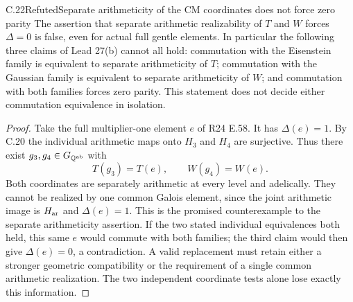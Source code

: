 \begin{statement}{C.22}{Refuted}{Separate arithmeticity of the CM coordinates does not force zero parity}
The assertion that separate arithmetic realizability of $T$
and $W$ forces $\Delta=0$ is false, even for actual full
gentle elements. In particular the following three claims
of Lead 27(b) cannot all hold: commutation with the
Eisenstein family is equivalent to separate arithmeticity
of $T$; commutation with the Gaussian family is equivalent
to separate arithmeticity of $W$; and commutation with
both families forces zero parity.
This statement does not decide either commutation
equivalence in isolation.
\end{statement}
\begin{proof}
Take the full multiplier-one element $e$ of R24 E.58.
It has $\Delta(e)=1$. By C.20 the individual arithmetic
maps onto $H_3$ and $H_4$ are surjective. Thus there
exist $g_3,g_4\in G_{\mathbb Q^{\rm ab}}$ with
\[
                  T(g_3)=T(e),\qquad W(g_4)=W(e).
\]
Both coordinates are separately arithmetic at every
level and adelically. They cannot be realized by one
common Galois element, since the joint arithmetic
image is $H_{\rm ar}$ and $\Delta(e)=1$.
This is the promised counterexample to the separate
arithmeticity assertion. If the two stated individual
equivalences both held, this same $e$ would commute
with both families; the third claim would then give
$\Delta(e)=0$, a contradiction. A valid replacement
must retain either a stronger geometric compatibility
or the requirement of a single common arithmetic
realization. The two independent coordinate tests
alone lose exactly this information.
\end{proof}

